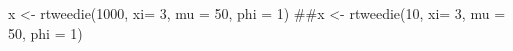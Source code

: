 \begin{Schunk}
\begin{Sinput}
  x <- rtweedie(1000, xi= 3, mu = 50, phi = 1)
  ##x <- rtweedie(10, xi= 3, mu = 50, phi = 1)
\end{Sinput}
\end{Schunk}
